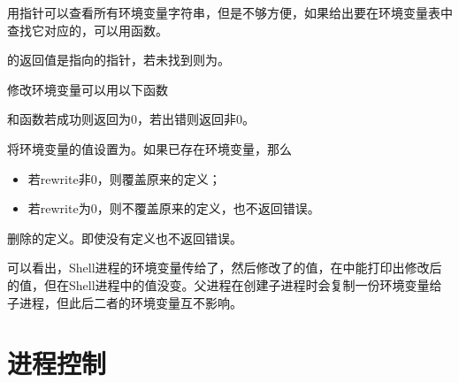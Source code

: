 用指针可以查看所有环境变量字符串，但是不够方便，如果给出要在环境变量表中查找它对应的，可以用函数。




的返回值是指向的指针，若未找到则为。



修改环境变量可以用以下函数




和函数若成功则返回为0，若出错则返回非0。



将环境变量的值设置为。如果已存在环境变量，那么


\begin{itemize}

\item 若rewrite非0，则覆盖原来的定义；

\item 若rewrite为0，则不覆盖原来的定义，也不返回错误。
\end{itemize}


删除的定义。即使没有定义也不返回错误。






可以看出，Shell进程的环境变量传给了，然后修改了的值，在中能打印出修改后的值，但在Shell进程中的值没变。父进程在创建子进程时会复制一份环境变量给子进程，但此后二者的环境变量互不影响。




\section{进程控制}
%

